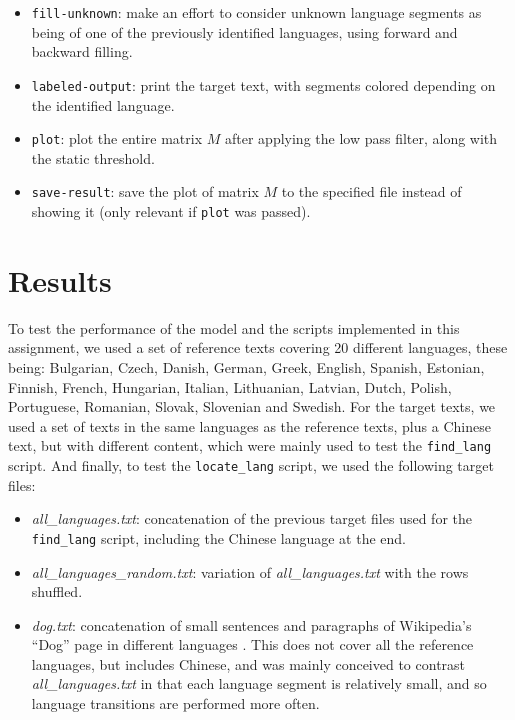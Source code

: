 \documentclass{article}
\begin{document}
\begin{itemize}
    \item \texttt{fill-unknown}: make an effort to consider unknown language segments as being of one of the previously identified languages, using forward and backward filling.
    \item \texttt{labeled-output}: print the target text, with segments colored depending on the identified language.
    \item \texttt{plot}: plot the entire matrix $M$ after applying the low pass filter, along with the static threshold.
    \item \texttt{save-result}: save the plot of matrix $M$ to the specified file instead of showing it (only relevant if \texttt{plot} was passed).
\end{itemize}

\section{Results}
\label{sec:results}


To test the performance of the model and the scripts implemented in this assignment, we used a set of reference texts covering 20 different languages,
these being: Bulgarian, Czech, Danish, German, Greek, English, Spanish, Estonian, Finnish, French, Hungarian, Italian, Lithuanian, Latvian, Dutch, Polish, Portuguese, Romanian, Slovak, Slovenian and Swedish.
For the target texts, we used a set of texts in the same languages as the reference texts, plus a Chinese text, but with different content, which were mainly used to test the \texttt{find_lang} script.
And finally, to test the \texttt{locate_lang} script, we used the following target files:

\begin{itemize}
    \item \textit{all\_languages.txt}: concatenation of the previous target files used for the \texttt{find_lang} script, including the Chinese language at the end.
    \item \textit{all\_languages\_random.txt}: variation of \textit{all_languages.txt} with the rows shuffled.
    \item \textit{dog.txt}: concatenation of small sentences and paragraphs of Wikipedia's ``Dog'' page in different languages \cite{wiki:dog}. This does not cover all the reference languages, but includes Chinese, and was mainly conceived to contrast \textit{all\_languages.txt} in that each language segment is relatively small, and so language transitions are performed more often.
\end{itemize}
\end{document}
